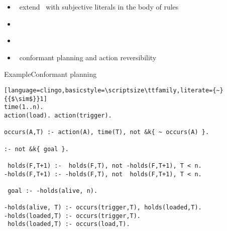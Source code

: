 \begin{frame}{\eclingo}
  \begin{itemize}
  \item {} \ extend \clingo\ with subjective literals in the body of rules
  \item {} \
  \item {} \ \cite{cafagarosc20a}
  \item {} \ conformant planning \cite{cafafa21a} and action reversibility \cite{famoch21a}
  \end{itemize}
\end{frame}
\begin{frame}[fragile]{Example}{Conformant planning}
\begin{lstlisting}[language=clingo,basicstyle=\scriptsize\ttfamily,literate={~}{{$\sim$}}1]
time(1..n).
action(load). action(trigger).

occurs(A,T) :- action(A), time(T), not &k{ ~ occurs(A) }.

:- not &k{ goal }.

 holds(F,T+1) :-  holds(F,T), not -holds(F,T+1), T < n.
-holds(F,T+1) :- -holds(F,T), not  holds(F,T+1), T < n.

 goal :- -holds(alive, n).

-holds(alive, T) :- occurs(trigger,T), holds(loaded,T).
-holds(loaded,T) :- occurs(trigger,T).
 holds(loaded,T) :- occurs(load,T).
\end{lstlisting}
\end{frame}
%
